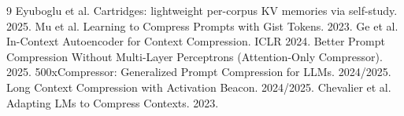 \documentclass[11pt]{article}
\begin{document}
\begin{thebibliography}{9}\small
{} Eyuboglu et al. Cartridges: lightweight per-corpus KV memories via self-study. 2025.
 Mu et al. Learning to Compress Prompts with Gist Tokens. 2023.
 Ge et al. In-Context Autoencoder for Context Compression. ICLR 2024.
 Better Prompt Compression Without Multi-Layer Perceptrons (Attention-Only Compressor). 2025.
 500xCompressor: Generalized Prompt Compression for LLMs. 2024/2025.
 Long Context Compression with Activation Beacon. 2024/2025.
 Chevalier et al. Adapting LMs to Compress Contexts. 2023.
\end{thebibliography}
\end{document}
